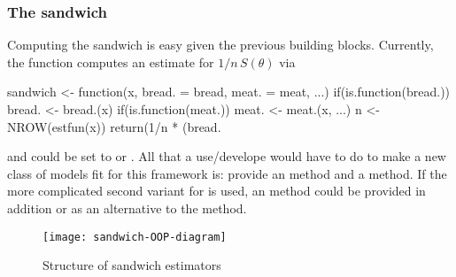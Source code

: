 \documentclass{Z}
\begin{document}
\subsubsection*{The sandwich}

Computing the sandwich is easy given the previous building blocks. Currently, the 
function  computes an estimate for $1/n \, S(\theta)$ via
\begin{Schunk}
\begin{Sinput}
sandwich <- function(x, bread. = bread, meat. = meat, ...)
{
  if(is.function(bread.)) bread. <- bread.(x)
  if(is.function(meat.)) meat. <- meat.(x, ...)
  n <- NROW(estfun(x))
  return(1/n * (bread. %*% meat. %*% bread.))
}
\end{Sinput}
\end{Schunk}
and  could be set to  or . All that a
use/develope would have to do to make a new class of models fit for this
framework is: provide an  method and a  method. If the more
complicated second variant for  is used, an  method
could be provided in addition or as an alternative to the  method.


\begin{figure}[tbh]
\begin{center}
\texttt{[image: sandwich-OOP-diagram]}
\caption{\label{fig:diagram} Structure of sandwich estimators}
\end{center}
\end{figure}
\end{document}
